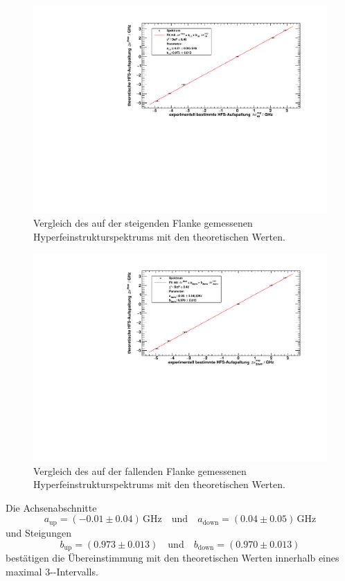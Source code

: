 \begin{figure}[H]
\begin{center}
    \includegraphics[width=\textwidth]{../img/part2/up-spectrum.pdf}
    \caption{Vergleich des auf der steigenden Flanke gemessenen Hyperfeinstrukturspektrums mit den theoretischen Werten.}
    \label{img:hfs:spectrum:up}
\end{center}
\end{figure}

\begin{figure}[H]
\begin{center}
    \includegraphics[width=\textwidth]{../img/part2/down-spectrum.pdf}
    \caption{Vergleich des auf der fallenden Flanke gemessenen Hyperfeinstrukturspektrums mit den theoretischen Werten.}
    \label{img:hfs:spectrum:down}
\end{center}
\end{figure}
Die Achsenabschnitte 
\begin{equation}
    a_\text{up} = (-0.01 \pm 0.04)\,\text{GHz} \quad \text{und} \quad a_\text{down} = (0.04 \pm 0.05)\,\text{GHz}
\end{equation}
und Steigungen
\begin{equation}
    b_\text{up} = (0.973 \pm 0.013) \quad \text{und} \quad b_\text{down} = (0.970 \pm 0.013)
\end{equation}
bestätigen die Übereinstimmung mit den theoretischen Werten innerhalb eines maximal 3-\textsigma-Intervalls.

